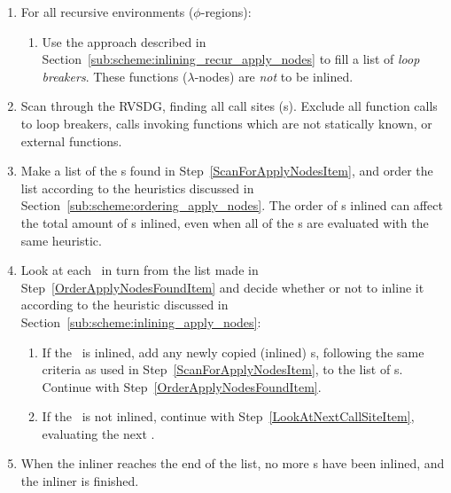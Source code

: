 \begin{enumerate}
	\item For all recursive environments ($\phi$-regions):

	\begin{enumerate}
		\item Use the approach described in
Section~\ref{sub:scheme:inlining_recur_apply_nodes} to fill a list of
\textit{loop breakers}. These functions ($\lambda$-nodes) are \textit{not} to be
inlined.
		\label{MakeLoopBreakerListItem}
	\end{enumerate}

	\item Scan through the RVSDG, finding all call sites (\applyNode s). Exclude
all function calls to loop breakers, calls invoking functions which are not
statically known, or external functions.
	\label{ScanForApplyNodesItem}

	\item Make a list of the \applyNode s found in
Step~\ref{ScanForApplyNodesItem}, and order the list according to the heuristics
discussed in Section~\ref{sub:scheme:ordering_apply_nodes}. The order of
\applyNode s inlined can affect the total amount of \applyNode s inlined, even
when all of the \applyNode s are evaluated with the same heuristic.
\label{OrderApplyNodesFoundItem}

	\item Look at each \applyNode~in turn from the list made in
Step~\ref{OrderApplyNodesFoundItem} and decide whether or not to inline it
according to the heuristic discussed in
Section~\ref{sub:scheme:inlining_apply_nodes}:
	\label{LookAtNextCallSiteItem}

	\begin{enumerate}
		\item If the \applyNode~is inlined, add any newly copied (inlined)
\applyNode s, following the same criteria as used in
Step~\ref{ScanForApplyNodesItem}, to the list of \applyNode s. Continue with
Step~\ref{OrderApplyNodesFoundItem}.

		\item If the \applyNode~is not inlined, continue with
Step~\ref{LookAtNextCallSiteItem}, evaluating the next \applyNode .
		\label{InlineCallSiteItem}
	\end{enumerate}

	\item When the inliner reaches the end of the list, no more \applyNode s
have been inlined, and the inliner is finished.
\end{enumerate}

